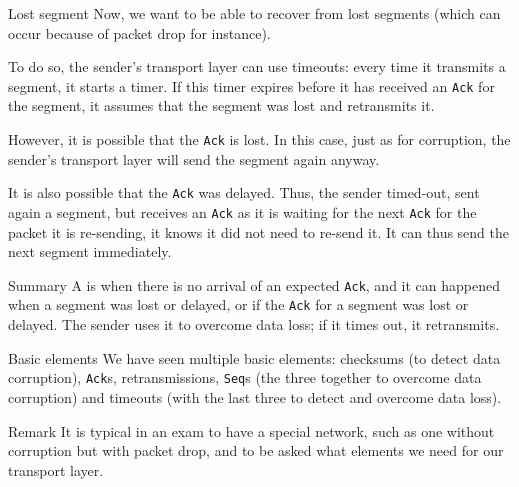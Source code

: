 \documentclass[a4paper]{article}
\begin{document}
\begin{parag}{Lost segment}
    Now, we want to be able to recover from lost segments (which can occur because of packet drop for instance).

    To do so, the sender's transport layer can use timeouts: every time it transmits a segment, it starts a timer. If this timer expires before it has received an \texttt{Ack} for the segment, it assumes that the segment was lost and retransmits it.

    However, it is possible that the \texttt{Ack} is lost. In this case, just as for corruption, the sender's transport layer will send the segment again anyway.

    It is also possible that the \texttt{Ack} was delayed. Thus, the sender timed-out, sent again a segment, but receives an \texttt{Ack} as it is waiting for the next \texttt{Ack} for the packet it is re-sending, it knows it did not need to re-send it. It can thus send the next segment immediately.

    \begin{subparag}{Summary}
        A  is when there is no arrival of an expected \texttt{Ack}, and it can happened when a segment was lost or delayed, or if the \texttt{Ack} for a segment was lost or delayed. The sender uses it to overcome data loss; if it times out, it retransmits.
    \end{subparag}
\end{parag}

\begin{parag}{Basic elements}
    We have seen multiple basic elements: checksums (to detect data corruption), \texttt{Ack}s, retransmissions, \texttt{Seq}s (the three together to overcome data corruption) and timeouts (with the last three to detect and overcome data loss). 

    \begin{subparag}{Remark}
        It is typical in an exam to have a special network, such as one without corruption but with packet drop, and to be asked what elements we need for our transport layer.
    \end{subparag}
\end{parag}
\end{document}

